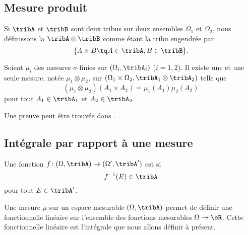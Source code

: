 \subsection{Mesure produit}

\begin{definition}      \label{DefTribProfGfYTuR}
    Si \( \tribA\) et \( \tribB\) sont deux tribus sur deux ensembles \( \Omega_1\) et \( \Omega_2\), nous définissons la  \( \tribA\otimes\tribB\) comme étant la tribu engendrée par 
    \begin{equation}
        \{ A\times B\tq A\in\tribA,B\in\tribB \}.
    \end{equation}
\end{definition}

\begin{theorem}
    Soient \( \mu_i\) des mesures $\sigma$-finies sur \( (\Omega_i,\tribA_i)\) (\( i=1,2\)). Il existe une et une seule mesure, notée \( \mu_1\otimes \mu_2\), sur \( (\Omega_1\times\Omega_2,\tribA_1\otimes\tribA_2)\) telle que
    \begin{equation}
        (\mu_1\otimes\mu_2)(A_1\times A_2)=\mu_1(A_1)\mu_2(A_2)
    \end{equation}
    pour tout \( A_1\in \tribA_1\) et \( A_2\in\tribA_2\).
\end{theorem}
Une preuve peut être trouvée dans \cite{FubiniBMauray}.

\subsection{Intégrale par rapport à une mesure}

Une fonction \( f\colon (\Omega,\tribA)\to (\Omega',\tribA')\) est  si 
\begin{equation}
    f^{-1}(E)\in\tribA
\end{equation}
pour tout \( E\in\tribA'\).


Une mesure \( \mu\) sur un espace mesurable \( (\Omega,\tribA)\) permet de définir une fonctionnelle linéaire sur l'ensemble des fonctions mesurables \( \Omega\to \eR\). Cette fonctionnelle linéaire est l'intégrale que nous allons définir à présent.

